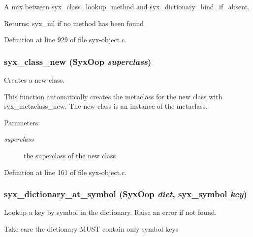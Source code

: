 A mix between syx\_\-class\_\-lookup\_\-method and syx\_\-dictionary\_\-bind\_\-if\_\-absent.

\begin{Desc}
\item[Returns:]syx\_\-nil if no method has been found \end{Desc}


Definition at line 929 of file syx-object.c.\hypertarget{syx-object_8c_6067196d3fd562cb85f54784232b604a}{
\subsubsection{ syx\_\-class\_\-new ({\bf SyxOop} {\em superclass})}}
\label{syx-object_8c_6067196d3fd562cb85f54784232b604a}


Creates a new class.

This function automatically creates the metaclass for the new class with syx\_\-metaclass\_\-new. The new class is an instance of the metaclass.

\begin{Desc}
\item[Parameters:]
\begin{description}
\item[{\em superclass}]the superclass of the new class \end{description}
\end{Desc}


Definition at line 161 of file syx-object.c.\hypertarget{syx-object_8c_d21c4f116141ae2ac9d43ca94c902f90}{
\subsubsection{ syx\_\-dictionary\_\-at\_\-symbol ({\bf SyxOop} {\em dict}, \/  {\bf syx\_\-symbol} {\em key})}}
\label{syx-object_8c_d21c4f116141ae2ac9d43ca94c902f90}


Lookup a key by symbol in the dictionary. Raise an error if not found.

Take care the dictionary MUST contain only symbol keys 

